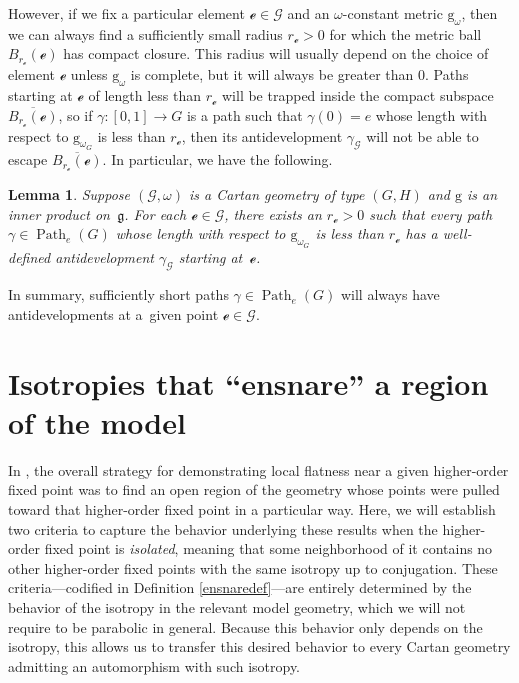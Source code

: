 \documentclass[10pt,a4paper]{amsart}
\numberwithin{equation}{section}
\newtheorem{Lemma}[Theorem]{Lemma}
\theoremstyle{definition}
\DeclareMathOperator{\Path}{Path}
\begin{document}
However, if we fix a particular element $\mathscr{e}\in\mathscr{G}$ and an $\omega$-constant metric $\mathrm{g}_\omega$, then we can always find a sufficiently small radius $r_\mathscr{e}>0$ for which the metric ball $B_{r_\mathscr{e}}(\mathscr{e})$ has compact closure. This radius will usually depend on the choice of element $\mathscr{e}$ unless $\mathrm{g}_\omega$ is complete, but it will always be greater than $0$. Paths starting at $\mathscr{e}$ of length less than $r_\mathscr{e}$ will be trapped inside the compact subspace $\overline{B_{r_\mathscr{e}}(\mathscr{e})}$, so if $\gamma \colon [0,1]\to G$ is a path such that $\gamma(0)=e$ whose length with respect to $\mathrm{g}_{\omega_G}$ is less than $r_\mathscr{e}$, then its antidevelopment $\gamma_\mathscr{G}$ will not be able to escape $\overline{B_{r_\mathscr{e}}(\mathscr{e})}$. In particular, we have the following.

\begin{Lemma}\label{shortantidevs} Suppose $(\mathscr{G},\omega)$ is a Cartan geometry of type $(G,H)$ and $\mathrm{g}$ is an inner product on~$\mathfrak{g}$. For each $\mathscr{e}\in\mathscr{G}$, there exists an $r_\mathscr{e}>0$ such that every path $\gamma\in\Path_e(G)$ whose length with respect to $\mathrm{g}_{\omega_G}$ is less than $r_\mathscr{e}$ has a well-defined antidevelopment $\gamma_\mathscr{G}$ starting at~$\mathscr{e}$.\end{Lemma}

In summary, sufficiently short paths $\gamma\in\Path_e(G)$ will always have antidevelopments at a~given point $\mathscr{e}\in\mathscr{G}$.

\section{Isotropies that ``ensnare'' a region of the model}\label{snares}
In \cite{CapMelnick2013,MelnickNeusser2016}, the overall strategy for demonstrating local flatness near a given higher-order fixed point was to find an open region of the geometry whose points were pulled toward that higher-order fixed point in a particular way. Here, we will establish two criteria to capture the behavior underlying these results when the higher-order fixed point is \textit{isolated}, meaning that some neighborhood of it contains no other higher-order fixed points with the same isotropy up to conjugation. These criteria---codified in Definition \ref{ensnaredef}---are entirely determined by the behavior of the isotropy in the relevant model geometry, which we will not require to be parabolic in general. Because this behavior only depends on the isotropy, this allows us to transfer this desired behavior to every Cartan geometry admitting an automorphism with such isotropy.
\end{document}
